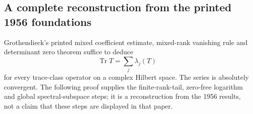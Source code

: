 \subsection{A complete reconstruction from the printed 1956 foundations}
\begin{proposition}
\label{geo-H-1956-reconstruction}
Grothendieck's printed mixed coefficient estimate, mixed-rank vanishing
rule and determinant zero theorem suffice to deduce
\[
 \operatorname{Tr}T=\sum_j\lambda_j(T)
\]
for every trace-class operator on a complex Hilbert space. The series is
absolutely convergent. The following proof supplies the finite-rank-tail,
zero-free logarithm and global spectral-subspace steps; it is a
reconstruction from the 1956 results, not a claim that these steps are
displayed in that paper.
\end{proposition}
